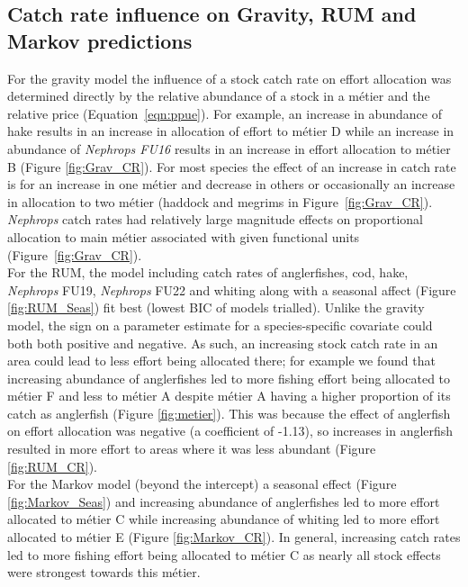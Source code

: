 \documentclass[12pt, halfline, a4paper]{ouparticle}
\begin{document}
\subsection{Catch rate influence on Gravity, RUM and Markov predictions}

For the gravity model the influence of a stock catch rate on effort allocation
was determined directly by the relative abundance of a stock in a métier and
the relative price (Equation~\ref{eqn:ppue}). For example, an increase in
abundance of hake results in an increase in allocation of effort to métier D
while an increase in abundance of \textit{Nephrops FU16} results in an increase
in effort allocation to métier B (Figure \ref{fig:Grav_CR}). For most species
the effect of an increase in catch rate is for an increase in one métier and
decrease in others or occasionally an increase in allocation to two métier
(haddock and megrims in Figure~\ref{fig:Grav_CR}). \textit{Nephrops} catch
rates had relatively large magnitude effects on proportional allocation to main
métier associated with given functional units (Figure~\ref{fig:Grav_CR}). \\

For the RUM, the model including catch rates of anglerfishes, cod, hake,
\textit{Nephrops} FU19, \textit{Nephrops} FU22 and whiting along with a
seasonal affect (Figure \ref{fig:RUM_Seas}) fit best (lowest BIC of models
trialled). Unlike the gravity model, the sign on a parameter estimate for a
species-specific covariate could both both positive and negative. As such, an
increasing stock catch rate in an area could lead to less effort being
allocated there; for example we found that increasing abundance of anglerfishes
led to more fishing effort being allocated to métier F and less to métier A
despite métier A having a higher proportion of its catch as anglerfish (Figure
\ref{fig:metier}). This was because the effect of anglerfish on effort
allocation was negative (a coefficient of -1.13), so increases in anglerfish
resulted in more effort to areas where it was less abundant (Figure
\ref{fig:RUM_CR}). \\

For the Markov model (beyond the intercept) a seasonal effect (Figure
\ref{fig:Markov_Seas}) and increasing abundance of anglerfishes led to more
effort allocated to métier C while increasing abundance of whiting led to more
effort allocated to métier E (Figure \ref{fig:Markov_CR}). In general,
increasing catch rates led to more fishing effort being allocated to métier C
as nearly all stock effects were strongest towards this métier. 
\end{document}
